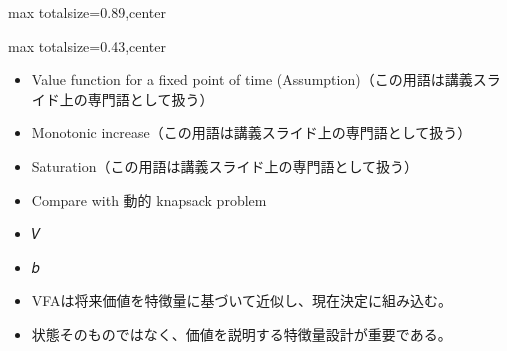 \begin{minipage}[t]{0.58\textwidth}
\begin{adjustbox}{max totalsize={\textwidth}{0.89\textheight},center}
\begin{minipage}{\textwidth}
\end{minipage}
\end{adjustbox}
\end{minipage}


\clearpage
{}
\begin{minipage}[t]{0.405\textwidth}
\begin{adjustbox}{max totalsize={\textwidth}{0.43\textheight},center}
\begin{minipage}{\textwidth}\scriptsize
{}\begin{itemize}
\item Value function for a fixed point of time (Assumption)（この用語は講義スライド上の専門語として扱う）
\item Monotonic increase（この用語は講義スライド上の専門語として扱う）
\item Saturation（この用語は講義スライド上の専門語として扱う）
\item Compare with 動的 knapsack problem
\item 𝑉
\item 𝑏
\end{itemize}\begin{itemize}
\item VFAは将来価値を特徴量に基づいて近似し、現在決定に組み込む。
\item 状態そのものではなく、価値を説明する特徴量設計が重要である。
\end{itemize}
\end{minipage}
\end{adjustbox}
\end{minipage}\hfill
